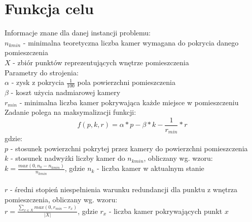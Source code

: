 \documentclass[12pt,a4paper]{article}
\begin{document}
\newpage
\section{Funkcja celu}
Informacje znane dla danej instancji problemu: \\
$n_{kmin}$ - minimalna teoretyczna liczba kamer wymagana do pokrycia danego pomieszczenia \\
$X$ - zbiór punktów reprezentujących wnętrze pomieszczenia \\
%
\newline
Parametry do strojenia: \\
$\alpha$ - zysk z pokrycia $\frac{1}{100}$ pola powierzchni pomieszczenia \\
$\beta$ - koszt użycia nadmiarowej kamery \\
$r_{min}$ - minimalna liczba kamer pokrywająca każde miejsce w pomieszczeniu \\
%
\newline
Zadanie polega na maksymalizacji funkcji: \\
$$f(p, k, r) = \alpha * p - \beta * k - \frac{1}{r_{min}} * r $$ 
gdzie: \\
$p$ - stosunek powierzchni pokrytej przez kamery do powierzchni pomieszczenia \\
$k$ - stosunek nadwyżki liczby kamer do $n_{kmin}$, obliczany wg. wzoru: \\
\indent $k = \frac{max(0, n_k - n_{kmin})}{n_{kmin}}$, gdzie $n_k$ - liczba kamer w aktualnym stanie \\\\
$r$ - średni stopień niespełnienia warunku redundancji dla punktu z wnętrza pomieszczenia, obliczany wg. wzoru: \\
\indent $r = \frac{\sum_{x \in X}^{} max(0, r_{min} - r_x)}{|X|}$, gdzie $r_x$ - liczba kamer pokrywających punkt $x$

%
\end{document}
